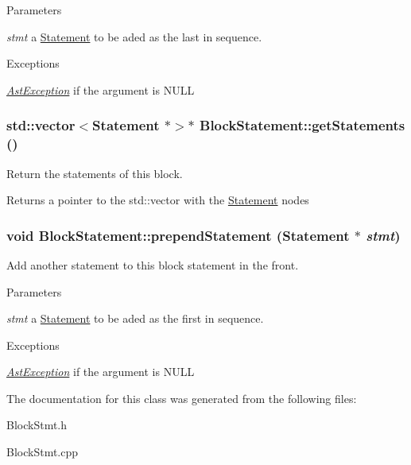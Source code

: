 \begin{DoxyParams}{Parameters}
\item[{\em stmt}]a \hyperlink{classStatement}{Statement} to be aded as the last in sequence. \end{DoxyParams}

\begin{DoxyExceptions}{Exceptions}
\item[{\em \hyperlink{classAstException}{AstException}}]if the argument is NULL \end{DoxyExceptions}
\hypertarget{classBlockStatement_a049f6ad899e8480dd3b55bab8f442928}{
\subsubsection[{getStatements}]{\setlength{\rightskip}{0pt plus 5cm}std::vector$<${\bf Statement} $\ast$$>$$\ast$ BlockStatement::getStatements ()}}
\label{classBlockStatement_a049f6ad899e8480dd3b55bab8f442928}
Return the statements of this block.

\begin{DoxyReturn}{Returns}
a pointer to the std::vector with the \hyperlink{classStatement}{Statement} nodes 
\end{DoxyReturn}
\hypertarget{classBlockStatement_a36f2db846cf7f7a559e8b19b5e3d5c01}{
\subsubsection[{prependStatement}]{\setlength{\rightskip}{0pt plus 5cm}void BlockStatement::prependStatement ({\bf Statement} $\ast$ {\em stmt})}}
\label{classBlockStatement_a36f2db846cf7f7a559e8b19b5e3d5c01}
Add another statement to this block statement in the front.


\begin{DoxyParams}{Parameters}
\item[{\em stmt}]a \hyperlink{classStatement}{Statement} to be aded as the first in sequence. \end{DoxyParams}

\begin{DoxyExceptions}{Exceptions}
\item[{\em \hyperlink{classAstException}{AstException}}]if the argument is NULL \end{DoxyExceptions}


The documentation for this class was generated from the following files:\begin{DoxyCompactItemize}
\item 
BlockStmt.h\item 
BlockStmt.cpp\end{DoxyCompactItemize}

